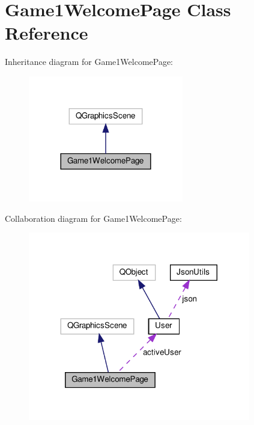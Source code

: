 \hypertarget{classGame1WelcomePage}{}\section{Game1\+Welcome\+Page Class Reference}
\label{classGame1WelcomePage}


Inheritance diagram for Game1\+Welcome\+Page\+:
\nopagebreak
\begin{figure}[H]
\begin{center}
\leavevmode
\includegraphics[width=192pt]{classGame1WelcomePage__inherit__graph}
\end{center}
\end{figure}


Collaboration diagram for Game1\+Welcome\+Page\+:
\nopagebreak
\begin{figure}[H]
\begin{center}
\leavevmode
\includegraphics[width=275pt]{classGame1WelcomePage__coll__graph}
\end{center}
\end{figure}
